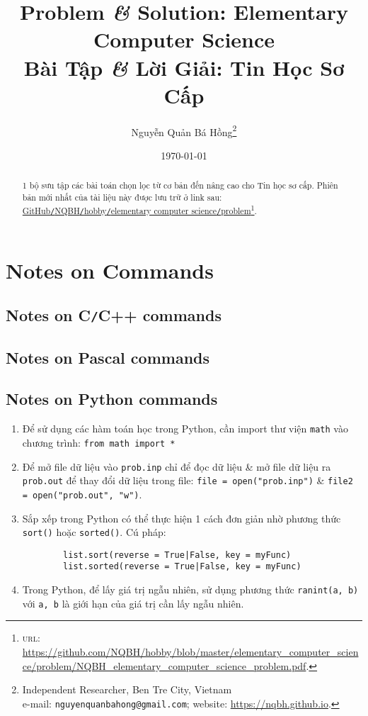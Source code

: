 \documentclass{article}
\title{Problem \textit{\&} Solution: Elementary Computer Science\\Bài Tập \textit{\&} Lời Giải: Tin Học Sơ Cấp}
\author{Nguyễn Quản Bá Hồng\footnote{Independent Researcher, Ben Tre City, Vietnam\\e-mail: \texttt{nguyenquanbahong@gmail.com}; website: \url{https://nqbh.github.io}.}}
\date{\today}
\begin{document}
\maketitle
\begin{abstract}
	1 bộ sưu tập các bài toán chọn lọc từ cơ bản đến nâng cao cho Tin học sơ cấp. Phiên bản mới nhất của tài liệu này được lưu trữ ở link sau: \href{https://github.com/NQBH/hobby/blob/master/elementary_computer_science/problem/NQBH_elementary_computer_science_problem.pdf}{GitHub\texttt{/}NQBH\texttt{/}hobby\texttt{/}elementary computer science\texttt{/}problem}\footnote{\textsc{url}: \url{https://github.com/NQBH/hobby/blob/master/elementary_computer_science/problem/NQBH_elementary_computer_science_problem.pdf}.}.
\end{abstract}
\tableofcontents


\section{Notes on Commands}

\subsection{Notes on C\texttt{/}C++ commands}

\subsection{Notes on Pascal commands}

\subsection{Notes on Python commands}

\begin{enumerate}
	\item Để sử dụng các hàm toán học trong Python, cần import thư viện \texttt{math} vào chương trình: \texttt{from math import *}
	\item Để mở file dữ liệu vào \texttt{prob.inp} chỉ để đọc dữ liệu \& mở file dữ liệu ra \texttt{prob.out} để thay đổi dữ liệu trong file: \texttt{file = open("prob.inp")} \& \texttt{file2 = open("prob.out", "w")}.
	\item Sắp xếp trong Python có thể thực hiện 1 cách đơn giản nhờ phương thức \texttt{sort()} hoặc \texttt{sorted()}. Cú pháp:
	\begin{verbatim}
		list.sort(reverse = True|False, key = myFunc)
		list.sorted(reverse = True|False, key = myFunc)
	\end{verbatim}
	\item Trong Python, để lấy giá trị ngẫu nhiên, sử dụng phương thức \texttt{ranint(a, b)} với \texttt{a, b} là giới hạn của giá trị cần lấy ngẫu nhiên.
\end{enumerate}
\end{document}
